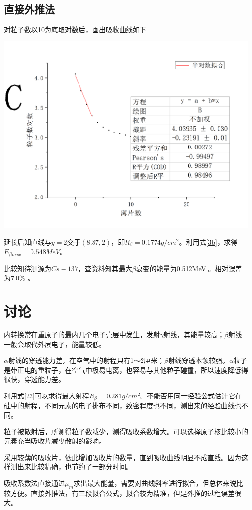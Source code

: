 \documentclass[hyperref]{ctexart}
\begin{document}
	\subsection{直接外推法}
	对粒子数以10为底取对数后，画出吸收曲线如下
	\begin{center}\includegraphics[scale=0.3]{t13}\end{center}
	延长后知直线与$y=2$交于$(8.87,2)$，即$R_{\beta} = 0.1774g/{cm}^2$。利用式\eqref{3b}，求得$E_{\beta max} = 0.548 MeV$。

	比较知待测源为$Cs-137$，查资料知其最大$\beta$衰变的能量为0.512MeV 。相对误差为7.0\% 。

	\section{讨论}
	 内转换常在重原子的最内几个电子壳层中发生，发射$\gamma$射线，其能量较高；$\beta$射线一般会取代外层电子，能量较低。

	$\alpha$射线的穿透能力差，在空气中的射程只有1～2厘米；$\beta$射线穿透本领较强。$\alpha$粒子是带正电的重粒子，在空气中极易电离，也容易与其他粒子碰撞，所以速度降低得很快，穿透能力差。

	利用式\eqref{22}可以求得最大射程$R_{\beta} = 0.281 g/{cm}^2$。不能否用同一经验公式估计它在硅中的射程，不同元素的电子排布不同，致密程度也不同，测出来的经验曲线也不同。

	粒子被散射后，所测得粒子数减少，测得吸收系数增大。可以选择原子核比较小的元素充当吸收片减少散射的影响。

	采用较薄的吸收片，依此增加吸收片的数量，直到吸收曲线明显不成直线。因为这样测出来比较精确，也节约了一部分时间。

	吸收系数法直接通过$\mu_m$求出最大能量，需要对曲线斜率进行拟合，但总体来说比较方便。直接外推法，有三段拟合公式，拟合较为精准，但是外推的过程误差很大。


















\end{document}
